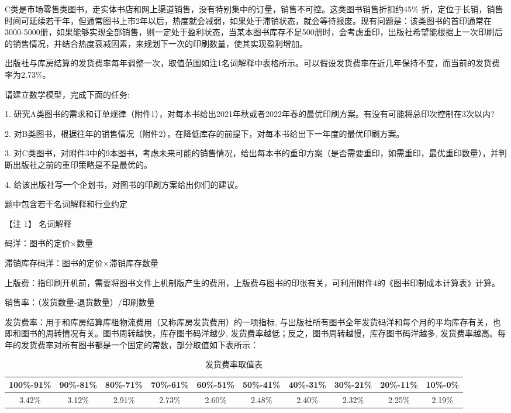 \documentclass[bwprint]{gmcmthesis}
\begin{document}
C类是市场零售类图书，走实体书店和网上渠道销售，没有特别集中的订量，销售不可控。这类图书销售折扣约45\% 折，定位于长销，销售时间可延续若干年，但通常图书上市2年以后，热度就会减弱，如果处于滞销状态，就会等待报废。现有问题是：该类图书的首印通常在3000-5000册，如果能够实现全部销售，则一定处于盈利状态，当某本图书库存不足500册时，会考虑重印，出版社希望能根据上一次印刷后的销售情况，并结合热度衰减因素，来规划下一次的印刷数量，使其实现盈利增加。

出版社与库房结算的发货费率每年调整一次，取值范围如注1名词解释中表格所示。可以假设发货费率在近几年保持不变，而当前的发货费率为2.73\%。

请建立数学模型，完成下面的任务:

1. 研究A类图书的需求和订单规律（附件1），对每本书给出2021年秋或者2022年春的最优印刷方案。有没有可能将总印次控制在3次以内? 

2. 对B类图书，根据往年的销售情况（附件2），在降低库存的前提下，对每本书给出下一年度的最优印刷方案。

3. 对C类图书，对附件3中的9本图书，考虑未来可能的销售情况，给出每本书的重印方案（是否需要重印，如需重印，最优重印数量），并判断出版社之前的重印策略是不是最优的。

4. 给该出版社写一个企划书，对图书的印刷方案给出你们的建议。

题中包含若干名词解释和行业约定

【注 1】 名词解释

码洋：图书的定价×数量

滞销库存码洋：图书的定价×滞销库存数量

上版费：指印刷开机前，需要将图书文件上机制版产生的费用，上版费与图书的印张有关，可利用附件4的《图书印制成本计算表》计算。

销售率：（发货数量-退货数量）/印刷数量

发货费率：用于和库房结算库租物流费用（又称库房发货费用）的一项指标, 与出版社所有图书全年发货码洋和每个月的平均库存有关，也即和图书的周转情况有关。图书周转越快，库存图书码洋越少, 发货费率越低；反之，图书周转越慢，库存图书码洋越多, 发货费率越高。每年的发货费率对所有图书都是一个固定的常数，部分取值如下表所示：

\begin{table}[htbp]
\resizebox{\textwidth}{!}
{
\begin{tabular}{|cccccccccc|}
\hline
100\%-91\% & 90\%-81\% & 80\%-71\% & 70\%-61\% & 60\%-51\% & 50\%-41\% & 40\%-31\% &30\%-21\%  & 20\%-11\% & 10\%-0\% \\
\hline
3.42\% & 3.12\% & 2.91\% & 2.73\% &	2.60\% & 2.48\% & 2.40\% & 2.32\% & 2.25\% & 2.19\% \\
\hline
\end{tabular}
}
\caption{发货费率取值表}
\label{tab:sr}
\end{table}
\end{document}
